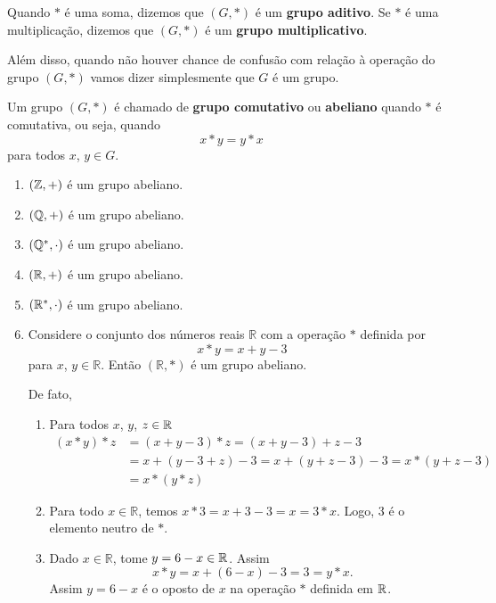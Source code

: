 \begin{observacao}
    Quando $*$ é uma soma, dizemos que $(G,*)$ é um \textbf{grupo aditivo}. Se $*$ é uma multiplicação, dizemos que $(G,*)$ é um \textbf{grupo multiplicativo}.

    Além disso, quando não houver chance de confusão com relação à operação do grupo $(G, *)$ vamos dizer simplesmente que $G$ é um grupo.
\end{observacao}

\begin{definicao}
    Um grupo $(G,*)$ é chamado de \textbf{grupo comutativo} ou \textbf{abeliano} quando $*$ é comutativa, ou seja, quando
    \[
        x*y = y*x
    \]
    para todos $x$, $y \in G$.
\end{definicao}

\begin{exemplos}
    \begin{enumerate}[label={\arabic*})]
        \item $(\mathbb{Z},+)$ é um grupo abeliano.
        \item $(\mathbb{Q},+)$ é um grupo abeliano.
        \item $(\mathbb{Q}^*,\cdot)$ é um grupo abeliano.
        \item $(\mathbb{R},+)$ é um grupo abeliano.
        \item $(\mathbb{R}^*,\cdot)$ é um grupo abeliano.
        \item Considere o conjunto dos números reais $\mathbb{R}$ com a operação $*$ definida por
        \[
            x*y = x + y - 3
        \]
        para $x$, $y \in \mathbb{R}$. Então $(\mathbb{R}, *)$ é um grupo abeliano.
        \begin{solucao}
            De fato,
            \begin{enumerate}[label={\roman*})]
                \item Para todos $x$, $y$, $z \in \mathbb{R}$
                \begin{align*}
                    (x*y)*z &= (x+y-3)*z = (x+y-3)+z-3\\
                    &= x+(y-3+z)-3 = x+(y+z-3)-3 = x*(y+z-3)\\
                    &= x*(y*z)
                \end{align*}

                \item Para todo $x \in \mathbb{R}$, temos $x*3 = x + 3 - 3 = x = 3 * x$. Logo, 3 é o elemento neutro de $*$.

                \item Dado $x \in \mathbb{R}$, tome $y = 6 - x \in \mathbb{R}$. Assim
                \[
                    x*y = x + (6-x)-3 = 3 = y*x.
                \]
                Assim $y = 6 - x$ é o oposto de $x$ na operação $*$ definida em $\mathbb{R}$.
            \end{enumerate}


\end{solucao}
\end{enumerate}
\end{exemplos}
